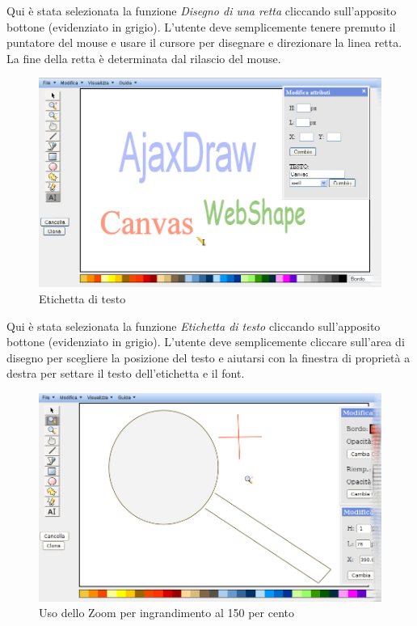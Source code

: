 \vspace{300pt}
Qui \`e stata selezionata la funzione \textit{Disegno di una retta} cliccando sull'apposito bottone (evidenziato in grigio). L'utente deve semplicemente tenere premuto il puntatore del mouse e usare il cursore per disegnare e direzionare la linea retta. La fine della retta \`e determinata dal rilascio del mouse.

\begin{figure}[!ht]
\centering
\includegraphics[scale=4]{images/label.png}
\caption{Etichetta di testo}
\end{figure} 

\vspace{300pt}
Qui \`e stata selezionata la funzione \textit{Etichetta di testo} cliccando sull'apposito bottone (evidenziato in grigio). L'utente deve semplicemente cliccare sull'area di disegno per scegliere la posizione del testo e aiutarsi con la finestra di propriet\`a a destra per settare il testo dell'etichetta e il font.
 
\begin{figure}[!ht]
\centering
\includegraphics[scale=4]{images/zoom_piu.png}
\caption{Uso dello Zoom per ingrandimento al 150 per cento}
\end{figure} 

